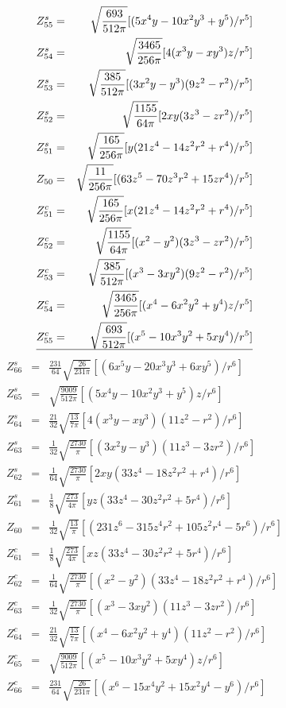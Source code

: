 \begin{eqnarray*}
Z^s_{55}&=&\sqrt{\frac{693}{512\pi}}[(5x^4y-10x^2y^3+y^5)/r^5] \\
Z^s_{54}&=&\sqrt{\frac{3465}{256\pi}}[4(x^3y-xy^3)z/r^5] \\
Z^s_{53}&=&\sqrt{\frac{385}{512\pi}}[(3x^2y-y^3)(9z^2-r^2)/r^5] \\
Z^s_{52}&=&\sqrt{\frac{1155}{64\pi}}[2xy(3z^3-zr^2)/r^5] \\
Z^s_{51}&=&\sqrt{\frac{165}{256\pi}}[y(21z^4-14z^2r^2+r^4)/r^5] \\
Z_{50}&=&\sqrt{\frac{11}{256\pi}}[(63z^5-70z^3r^2+15zr^4)/r^5] \\
Z^c_{51}&=&\sqrt{\frac{165}{256\pi}}[x(21z^4-14z^2r^2+r^4)/r^5] \\
Z^c_{52}&=&\sqrt{\frac{1155}{64\pi}}[(x^2-y^2)(3z^3-zr^2)/r^5] \\
Z^c_{53}&=&\sqrt{\frac{385}{512\pi}}[(x^3-3xy^2)(9z^2-r^2)/r^5] \\
Z^c_{54}&=&\sqrt{\frac{3465}{256\pi}}[(x^4-6x^2y^2+y^4)z/r^5] \\
Z^c_{55}&=&\sqrt{\frac{693}{512\pi}}[(x^5-10x^3y^2+5xy^4)/r^5] \\
\hline
\end{eqnarray*}
\begin{eqnarray*}
Z^s_{66}&=&\frac{231}{64}\sqrt{\frac{26}{231\pi}}[(6x^5y-20x^3y^3+6xy^5)/r^6] \\
Z^s_{65}&=&\sqrt{\frac{9009}{512\pi}}[(5x^4y-10x^2y^3+y^5)z/r^6] \\
Z^s_{64}&=&\frac{21}{32}\sqrt{\frac{13}{7\pi}}[4(x^3y-xy^3)(11z^2-r^2)/r^6] \\
Z^s_{63}&=&\frac{1}{32}\sqrt{\frac{2730}{\pi}}[(3x^2y-y^3)(11z^3-3zr^2)/r^6] \\
Z^s_{62}&=&\frac{1}{64}\sqrt{\frac{2730}{\pi}}[2xy(33z^4-18z^2r^2+r^4)/r^6] \\
Z^s_{61}&=&\frac{1}{8}\sqrt{\frac{273}{4\pi}}[yz(33z^4-30z^2r^2+5r^4)/r^6] \\
Z_{60}&=&\frac{1}{32}\sqrt{\frac{13}{\pi}}[(231z^6-315z^4r^2+105z^2r^4-5r^6)/r^6] \\
Z^c_{61}&=&\frac{1}{8}\sqrt{\frac{273}{4\pi}}[xz(33z^4-30z^2r^2+5r^4)/r^6] \\
Z^c_{62}&=&\frac{1}{64}\sqrt{\frac{2730}{\pi}}[(x^2-y^2)(33z^4-18z^2r^2+r^4)/r^6] \\
Z^c_{63}&=&\frac{1}{32}\sqrt{\frac{2730}{\pi}}[(x^3-3xy^2)(11z^3-3zr^2)/r^6] \\
Z^c_{64}&=&\frac{21}{32}\sqrt{\frac{13}{7\pi}}[(x^4-6x^2y^2+y^4)(11z^2-r^2)/r^6] \\
Z^c_{65}&=&\sqrt{\frac{9009}{512\pi}}[(x^5-10x^3y^2+5xy^4)z/r^6] \\
Z^c_{66}&=&\frac{231}{64}\sqrt{\frac{26}{231\pi}}[(x^6-15x^4y^2+15x^2y^4-y^6)/r^6] 
\end{eqnarray*}






